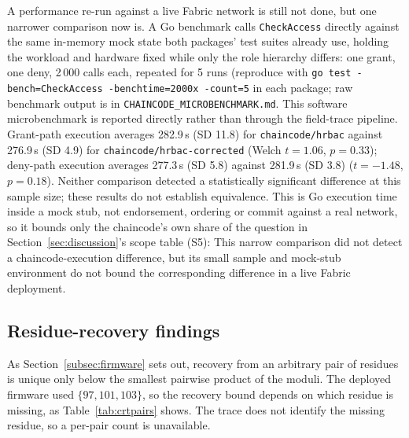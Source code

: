 \documentclass[a4paper,fleqn]{cas-sc}
\begin{document}
A performance re-run against a live Fabric network is still not done, but
one narrower comparison now is. A Go benchmark calls \texttt{CheckAccess}
directly against the same in-memory mock state both packages' test suites
already use, holding the workload and hardware fixed while only the role
hierarchy differs: one grant, one deny, 2\,000 calls each, repeated for 5
runs (reproduce with \texttt{go test -bench=CheckAccess -benchtime=2000x
-count=5} in each package; raw benchmark output is in
\texttt{CHAINCODE\_MICROBENCHMARK.md}. This software microbenchmark is reported directly rather than through the field-trace pipeline. Grant-path
execution averages 282.9\,\textmu{}s (SD 11.8) for \texttt{chaincode/hrbac}
against 276.9\,\textmu{}s (SD 4.9) for \texttt{chaincode/hrbac-corrected}
(Welch $t=1.06$, $p=0.33$); deny-path execution averages 277.3\,\textmu{}s
(SD 5.8) against 281.9\,\textmu{}s (SD 3.8) ($t=-1.48$, $p=0.18$). Neither comparison detected a statistically significant difference at this sample size; these results do not establish equivalence.
This is Go execution time inside a mock stub, not endorsement, ordering or
commit against a real network, so it bounds only the chaincode's own share
of the question in Section~\ref{sec:discussion}'s scope table (S5):
This narrow comparison did not detect a chaincode-execution difference, but its small sample and mock-stub environment do not bound the corresponding difference in a live Fabric deployment.

\subsection{Residue-recovery findings}
\label{subsec:pm_crt}

As Section~\ref{subsec:firmware} sets out, recovery from an arbitrary pair
of residues is unique only below the smallest pairwise product of the
moduli. The deployed firmware used $\{97, 101, 103\}$, so the recovery
bound depends on which residue is missing, as Table~\ref{tab:crtpairs}
shows. The trace does not identify the missing residue, so a per-pair count
is unavailable.
\end{document}
